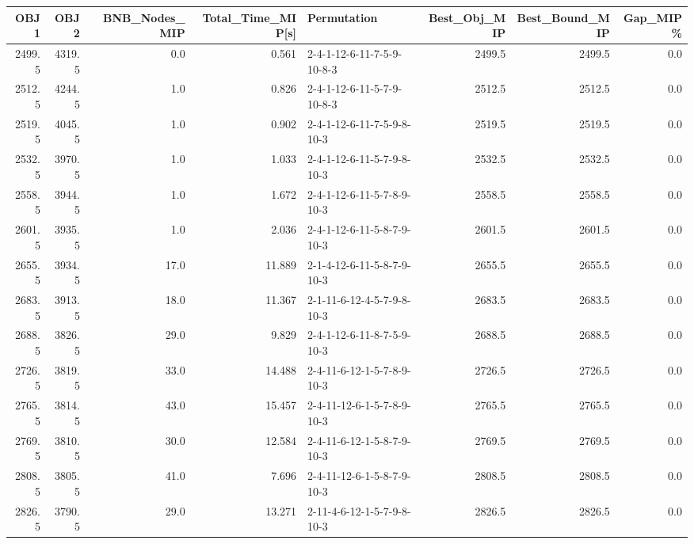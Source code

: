 \begin{tabular}{rrrrlrrr}
\toprule
   OBJ1 &    OBJ2 &  BNB\_Nodes\_MIP &  Total\_Time\_MIP[s] &                 Permutation &  Best\_Obj\_MIP &  Best\_Bound\_MIP &  Gap\_MIP\% \\
\midrule
 2499.5 &  4319.5 &            0.0 &              0.561 &  2-4-1-12-6-11-7-5-9-10-8-3 &        2499.5 &          2499.5 &       0.0 \\
 2512.5 &  4244.5 &            1.0 &              0.826 &  2-4-1-12-6-11-5-7-9-10-8-3 &        2512.5 &          2512.5 &       0.0 \\
 2519.5 &  4045.5 &            1.0 &              0.902 &  2-4-1-12-6-11-7-5-9-8-10-3 &        2519.5 &          2519.5 &       0.0 \\
 2532.5 &  3970.5 &            1.0 &              1.033 &  2-4-1-12-6-11-5-7-9-8-10-3 &        2532.5 &          2532.5 &       0.0 \\
 2558.5 &  3944.5 &            1.0 &              1.672 &  2-4-1-12-6-11-5-7-8-9-10-3 &        2558.5 &          2558.5 &       0.0 \\
 2601.5 &  3935.5 &            1.0 &              2.036 &  2-4-1-12-6-11-5-8-7-9-10-3 &        2601.5 &          2601.5 &       0.0 \\
 2655.5 &  3934.5 &           17.0 &             11.889 &  2-1-4-12-6-11-5-8-7-9-10-3 &        2655.5 &          2655.5 &       0.0 \\
 2683.5 &  3913.5 &           18.0 &             11.367 &  2-1-11-6-12-4-5-7-9-8-10-3 &        2683.5 &          2683.5 &       0.0 \\
 2688.5 &  3826.5 &           29.0 &              9.829 &  2-4-1-12-6-11-8-7-5-9-10-3 &        2688.5 &          2688.5 &       0.0 \\
 2726.5 &  3819.5 &           33.0 &             14.488 &  2-4-11-6-12-1-5-7-8-9-10-3 &        2726.5 &          2726.5 &       0.0 \\
 2765.5 &  3814.5 &           43.0 &             15.457 &  2-4-11-12-6-1-5-7-8-9-10-3 &        2765.5 &          2765.5 &       0.0 \\
 2769.5 &  3810.5 &           30.0 &             12.584 &  2-4-11-6-12-1-5-8-7-9-10-3 &        2769.5 &          2769.5 &       0.0 \\
 2808.5 &  3805.5 &           41.0 &              7.696 &  2-4-11-12-6-1-5-8-7-9-10-3 &        2808.5 &          2808.5 &       0.0 \\
 2826.5 &  3790.5 &           29.0 &             13.271 &  2-11-4-6-12-1-5-7-9-8-10-3 &        2826.5 &          2826.5 &       0.0 \\

\end{tabular}
